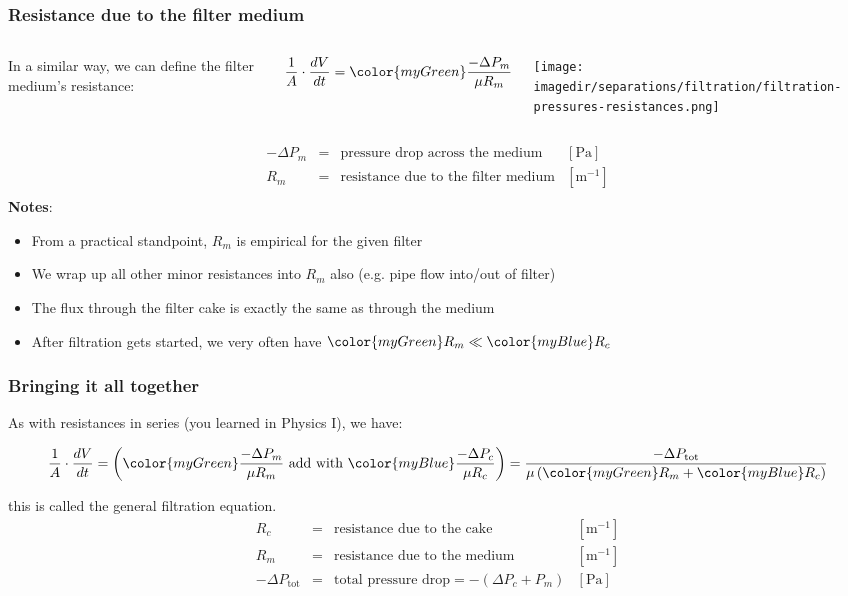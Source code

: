 \begin{frame}\frametitle{Resistance due to the filter medium}
	\begin{columns}[t]
			In a similar way, we can define the filter {\color{myGreen}medium}'s resistance:
			\begin{exampleblock}{}
				\[\dfrac{1}{A} \cdot \dfrac{dV}{dt} = {\color{myGreen}\dfrac{-\Delta P_m}{\mu R_m}} \]
			\end{exampleblock}
			\vspace{-24pt}
			\begin{center}
				\texttt{[image: \\imagedir/separations/filtration/filtration-pressures-resistances.png]}
			\end{center}
	\end{columns}
	\[
		\begin{array}{rcll}
			-\Delta P_m		&=& \text{pressure drop across the medium}			&[\text{Pa}]\\
			R_m  			&=& \text{resistance due to the filter medium}		&[\text{m}^{-1}]\\
		\end{array}
	\]
	\textbf{Notes}:
	\begin{itemize}
		\item	From a practical standpoint, $R_m$ is empirical for the given filter
		\item	We wrap up all other minor resistances into $R_m$ also (e.g. pipe flow into/out of filter)
		\item	The flux through the {\color{myBlue}filter cake} is exactly the same as through the {\color{myGreen} medium}
		\item	After filtration gets started, we very often have ${\color{myGreen}R_m} \ll {\color{myBlue}R_c}$
	\end{itemize}
\end{frame}

\begin{frame}\frametitle{Bringing it all together}
	As with resistances in series (you learned in Physics I), we have:
	\begin{exampleblock}{}
		\[\dfrac{1}{A} \cdot \dfrac{dV}{dt} = \left({\color{myGreen}\dfrac{-\Delta P_m}{\mu R_m}} \,\,\text{add with}\,\, {\color{myBlue}\dfrac{-\Delta P_c}{\mu R_c}}\right) = \dfrac{-\Delta P_\text{tot}}{\mu \left({\color{myGreen}R_m} + {\color{myBlue}R_c} \right)}\]
	\end{exampleblock}
	this is called the {\color{purple} general filtration equation}.
	\[
		\begin{array}{rcll}
			R_c  &=& \text{resistance due to the cake}				&[\text{m}^{-1}]\\
			R_m  &=& \text{resistance due to the medium}			&[\text{m}^{-1}]\\
			-\Delta P_\text{tot}	&=& \text{total pressure drop} = -(\Delta P_c + P_m)	&[\text{Pa}]
		\end{array}
	\]
\end{frame}

